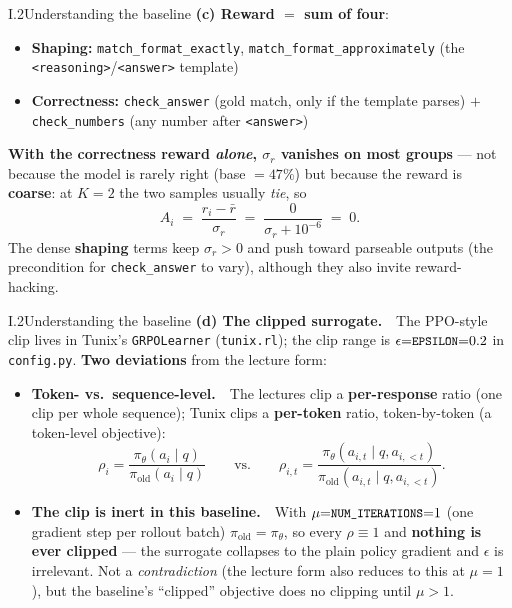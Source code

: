 \documentclass[aspectratio=169,11pt]{beamer}
\newcommand{\code}[1]{\texttt{\small #1}}
\newcommand{\pth}{\pi_\theta}
\newcommand{\pold}{\pi_{\mathrm{old}}}
\begin{document}
\begin{frame}{I.2\quad Understanding the baseline}
\textbf{(c) Reward $=$ sum of four}:
\begin{itemize}
  \item \textbf{Shaping:} \code{match\_format\_exactly}, \code{match\_format\_approximately} (the \code{<reasoning>}/\code{<answer>} template)
  \item \textbf{Correctness:} \code{check\_answer} (gold match, only if the template parses) $+$ \code{check\_numbers} (any number after \code{<answer>})
\end{itemize}
\vspace{4pt}
\textbf{With the correctness reward \emph{alone}, $\sigma_r$ vanishes on most groups} --- not because the model is rarely right (base $=47\%$) but because the reward is \textbf{coarse}: at $K{=}2$ the two samples usually \emph{tie}, so
\[
  \hat A_i \;=\; \frac{r_i-\bar r}{\sigma_r} \;=\; \frac{0}{\sigma_r+10^{-6}} \;=\; 0.
\]
The dense \textbf{shaping} terms keep $\sigma_r>0$ and push toward parseable outputs (the precondition for \code{check\_answer} to vary), although they also invite reward-hacking.
\end{frame}

\begin{frame}{I.2\quad Understanding the baseline}
\textbf{(d) The clipped surrogate.}\ \ The PPO-style clip lives in Tunix's \code{GRPOLearner} (\code{tunix.rl}); the clip range is $\epsilon{=}\code{EPSILON}{=}0.2$ in \code{config.py}. \textbf{Two deviations} from the lecture form:
\vspace{3pt}
\begin{itemize}
  \item[\textcolor{camblue}{\textbf{(i)}}] \textbf{Token- vs.\ sequence-level.}\ \ The lectures clip a \textbf{per-response} ratio (one clip per whole sequence); Tunix clips a \textbf{per-token} ratio, token-by-token (a token-level objective):
  \[
    \rho_i=\frac{\pth(a_i\mid q)}{\pold(a_i\mid q)}
    \qquad\text{vs.}\qquad
    \rho_{i,t}=\frac{\pth(a_{i,t}\mid q,a_{i,<t})}{\pold(a_{i,t}\mid q,a_{i,<t})}.
  \]
  \item[\textcolor{camblue}{\textbf{(ii)}}] \textbf{The clip is \alert{inert} in this baseline.}\ \ With $\mu{=}\code{NUM\_ITERATIONS}{=}1$ (one gradient step per rollout batch) $\pold{=}\pth$, so every $\rho\equiv1$ and \textbf{nothing is ever clipped} --- the surrogate collapses to the plain policy gradient and $\epsilon$ is irrelevant. Not a \emph{contradiction} (the lecture form also reduces to this at $\mu{=}1$), but the baseline's ``clipped'' objective does no clipping until $\mu>1$.
\end{itemize}
\end{frame}
\end{document}
